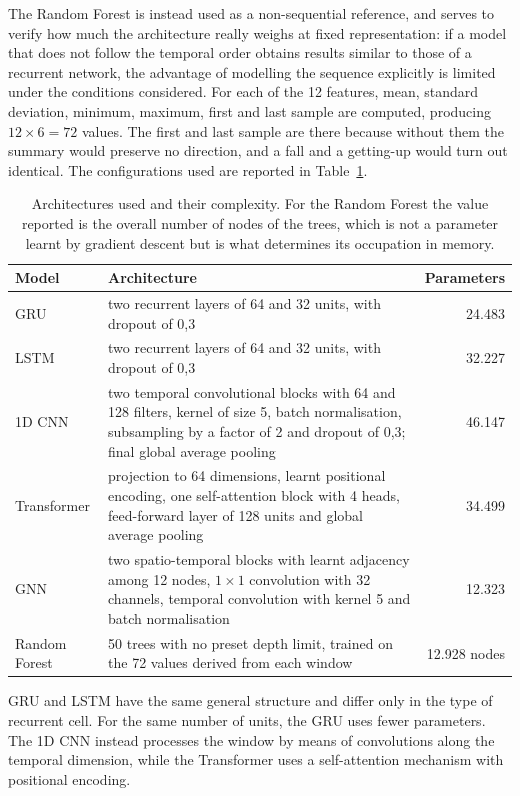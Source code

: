 The Random Forest is instead used as a non-sequential reference, and serves to verify how much the architecture really weighs at fixed representation: if a model that does not follow the temporal order obtains results similar to those of a recurrent network, the advantage of modelling the sequence explicitly is limited under the conditions considered.
For each of the 12 features, mean, standard deviation, minimum, maximum, first and last sample are computed, producing $12\times6=72$ values. The first and last sample are there because without them the summary would preserve no direction, and a fall and a getting-up would turn out identical.
The configurations used are reported in Table~\ref{tab:modelli}.

\begin{table}[htbp]
\centering
\caption{Architectures used and their complexity. For the Random Forest
the value reported is the overall number of nodes of the trees, which is not a
parameter learnt by gradient descent but is what determines its
occupation in memory.}
\label{tab:modelli}
\begin{tabular}{@{}p{2.2cm}p{8.8cm}r@{}}
\toprule
\textbf{Model} & \textbf{Architecture} & \textbf{Parameters} \\
\midrule
GRU & two recurrent layers of 64 and 32 units, with dropout of 0,3 & 24.483 \\
LSTM & two recurrent layers of 64 and 32 units, with dropout of 0,3 & 32.227 \\
1D CNN & two temporal convolutional blocks with 64 and 128 filters, kernel of size 5, batch normalisation, subsampling by a factor of 2 and dropout of 0,3; final global average pooling & 46.147 \\
Transformer & projection to 64 dimensions, learnt positional encoding, one self-attention block with 4 heads, feed-forward layer of 128 units and global average pooling & 34.499 \\
GNN & two spatio-temporal blocks with learnt adjacency among 12 nodes, \(1\times1\) convolution with 32 channels, temporal convolution with kernel 5 and batch normalisation & 12.323 \\
Random Forest & 50 trees with no preset depth limit, trained on the 72 values derived from each window & 12.928 nodes \\
\bottomrule
\end{tabular}
\end{table}

GRU and LSTM have the same general structure and differ only in the type of recurrent cell. For the same number of units, the GRU uses fewer parameters. The 1D CNN instead processes the window by means of convolutions along the temporal dimension, while the Transformer uses a self-attention mechanism with positional encoding.

